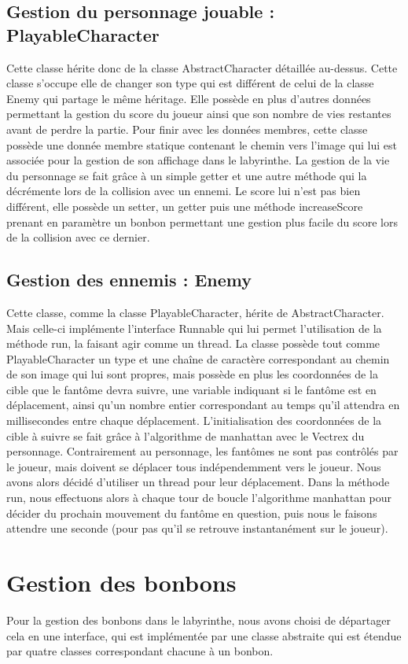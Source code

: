 \documentclass [10pt, a4paper]{article}
\begin{document}
\subsection {Gestion du personnage jouable : PlayableCharacter}
Cette classe hérite donc de la classe AbstractCharacter détaillée au-dessus. Cette classe s'occupe elle de changer son type qui est différent de celui de la classe Enemy qui partage le même héritage. Elle possède en plus d'autres données permettant la gestion du score du joueur ainsi que son nombre de vies restantes avant de perdre la partie. Pour finir avec les données membres, cette classe possède une donnée membre statique contenant le chemin vers l'image qui lui est associée pour la gestion de son affichage dans le labyrinthe. La gestion de la vie du personnage se fait grâce à un simple getter et une autre méthode qui la décrémente lors de la collision avec un ennemi. Le score lui n'est pas bien différent, elle possède un setter, un getter puis une méthode increaseScore prenant en paramètre un bonbon permettant une gestion plus facile du score lors de la collision avec ce dernier.

\subsection {Gestion des ennemis : Enemy}
Cette classe, comme la classe PlayableCharacter, hérite de AbstractCharacter. Mais celle-ci implémente l'interface Runnable qui lui permet l'utilisation de la méthode run, la faisant agir comme un thread. La classe possède tout comme PlayableCharacter un type et une chaîne de caractère correspondant au chemin de son image qui lui sont propres, mais possède en plus les coordonnées de la cible que le fantôme devra suivre, une variable indiquant si le fantôme est en déplacement, ainsi qu'un nombre entier correspondant au temps qu'il attendra en millisecondes entre chaque déplacement. L'initialisation des coordonnées de la cible à suivre se fait grâce à l'algorithme de manhattan avec le Vectrex du personnage. Contrairement au personnage, les fantômes ne sont pas contrôlés par le joueur, mais doivent se déplacer tous indépendemment vers le joueur. Nous avons alors décidé d'utiliser un thread pour leur déplacement. Dans la méthode run, nous effectuons alors à chaque tour de boucle l'algorithme manhattan pour décider du prochain mouvement du fantôme en question, puis nous le faisons attendre une seconde (pour pas qu'il se retrouve instantanément sur le joueur).

\section {Gestion des bonbons}
Pour la gestion des bonbons dans le labyrinthe, nous avons choisi de départager cela en une interface, qui est implémentée par une classe abstraite qui est étendue par quatre classes correspondant chacune à un bonbon.
\end{document}
